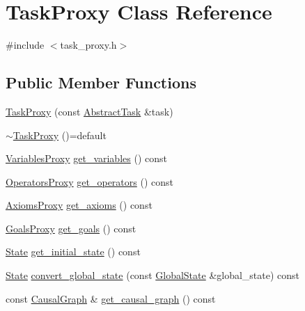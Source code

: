 \hypertarget{classTaskProxy}{\section{Task\-Proxy Class Reference}
\label{classTaskProxy}
}


{\ttfamily \#include $<$task\-\_\-proxy.\-h$>$}

\subsection*{Public Member Functions}
\begin{DoxyCompactItemize}
\item 
\hyperlink{classTaskProxy_ab2117046983e50fdb912776437b27735}{Task\-Proxy} (const \hyperlink{classAbstractTask}{Abstract\-Task} \&task)
\item 
\hyperlink{classTaskProxy_a54af2d1f03b098a016bad61b63a99a91}{$\sim$\-Task\-Proxy} ()=default
\item 
\hyperlink{classVariablesProxy}{Variables\-Proxy} \hyperlink{classTaskProxy_ac90edab81b6721935b4bc2a7f8a35463}{get\-\_\-variables} () const 
\item 
\hyperlink{classOperatorsProxy}{Operators\-Proxy} \hyperlink{classTaskProxy_a0f5cac4b7f9802ee580ef6cfce818365}{get\-\_\-operators} () const 
\item 
\hyperlink{classAxiomsProxy}{Axioms\-Proxy} \hyperlink{classTaskProxy_a50f8c773fed60b50000910c2d28eaa93}{get\-\_\-axioms} () const 
\item 
\hyperlink{classGoalsProxy}{Goals\-Proxy} \hyperlink{classTaskProxy_aea9718bc41d832ba8d587716db55c5cd}{get\-\_\-goals} () const 
\item 
\hyperlink{classState}{State} \hyperlink{classTaskProxy_a0b3d803f47cd0f8c1440093f72ccee15}{get\-\_\-initial\-\_\-state} () const 
\item 
\hyperlink{classState}{State} \hyperlink{classTaskProxy_a34cb2a41ebd0d1d89ab739d5eb2835f5}{convert\-\_\-global\-\_\-state} (const \hyperlink{classGlobalState}{Global\-State} \&global\-\_\-state) const 
\item 
const \hyperlink{classCausalGraph}{Causal\-Graph} \& \hyperlink{classTaskProxy_a7f570d47abadc5b8386aa0a4fee1b119}{get\-\_\-causal\-\_\-graph} () const 
\end{DoxyCompactItemize}


